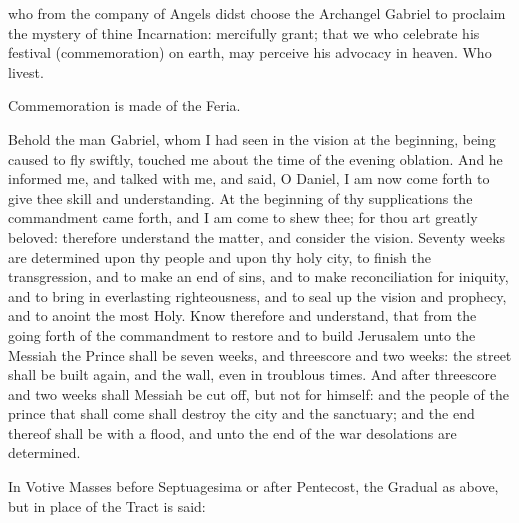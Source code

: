 \collect
{} who from the company of Angels didst choose the Archangel Gabriel to proclaim the mystery of thine Incarnation: mercifully grant; that we who celebrate his festival (commemoration) on earth, may perceive his advocacy in heaven. Who livest.

\begin{rubric}
	Commemoration is made of the Feria.
\end{rubric}

 Behold the man Gabriel, whom I had seen in the vision at the beginning, being caused to fly swiftly, touched me about the time of the evening oblation. And he informed me, and talked with me, and said, O Daniel, I am now come forth to give thee skill and understanding. At the beginning of thy supplications the commandment came forth, and I am come to shew thee; for thou art greatly beloved: therefore understand the matter, and consider the vision. Seventy weeks are determined upon thy people and upon thy holy city, to finish the transgression, and to make an end of sins, and to make reconciliation for iniquity, and to bring in everlasting righteousness, and to seal up the vision and prophecy, and to anoint the most Holy. Know therefore and understand, that from the going forth of the commandment to restore and to build Jerusalem unto the Messiah the Prince shall be seven weeks, and threescore and two weeks: the street shall be built again, and the wall, even in troublous times. And after threescore and two weeks shall Messiah be cut off, but not for himself: and the people of the prince that shall come shall destroy the city and the sanctuary; and the end thereof shall be with a flood, and unto the end of the war desolations are determined.


\begin{rubric}
	In Votive Masses before Septuagesima or after Pentecost, the Gradual as above, but in place of the Tract is said:
\end{rubric}

